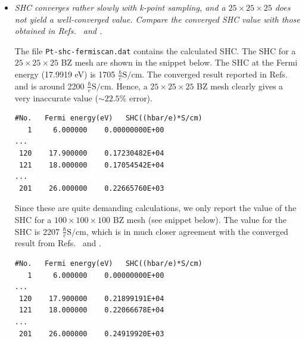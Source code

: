 \begin{itemize}
	\item {\it SHC converges rather slowly with k-point sampling, and a $25 \times 25 \times 25$ does not yield a well-converged value.
	Compare the converged SHC value with those obtained in Refs.~ and .}

	The file {\tt Pt-shc-fermiscan.dat} contains the calculated SHC. The SHC for a $25\times25\times25$ BZ mesh are shown in the snippet below. The SHC 
	at the Fermi energy (17.9919 eV) is 1705 $\frac{\hbar}{e}\mathrm{S/cm}$. 
	The converged result reported in Refs.~ and  is around 2200 $\frac{\hbar}{e}\mathrm{S/cm}$. Hence, a $25\times25\times25$ BZ mesh clearly gives a very inaccurate value ($\sim 22.5\%$ error).   

\begin{tcolorbox}[title=$25\times25\times25$ kmesh,sharp corners,boxrule=0.5pt]
{\small
\begin{verbatim}
#No.   Fermi energy(eV)   SHC((hbar/e)*S/cm)
   1     6.000000    0.00000000E+00
...
 120    17.900000    0.17230482E+04
 121    18.000000    0.17054542E+04
...
 201    26.000000    0.22665760E+03
\end{verbatim}
}
\end{tcolorbox}

Since these are quite demanding calculations, we only report the value of the SHC for a $100\times100\times100$ BZ mesh (see snippet below). The value for the SHC is 2207 $\frac{\hbar}{e}\mathrm{S/cm}$, which is in much closer agreement with the converged result from Refs.~ and .

\begin{tcolorbox}[title=$100\times100\times100$ kmesh,sharp corners,boxrule=0.5pt]
{\small
\begin{verbatim}
#No.   Fermi energy(eV)   SHC((hbar/e)*S/cm)
   1     6.000000    0.00000000E+00
...
 120    17.900000    0.21899191E+04
 121    18.000000    0.22066678E+04
...
 201    26.000000    0.24919920E+03
\end{verbatim}
}
\end{tcolorbox}


\end{itemize}
